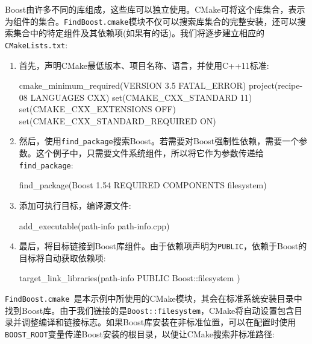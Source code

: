
Boost由许多不同的库组成，这些库可以独立使用。CMake可将这个库集合，表示为组件的集合。\texttt{FindBoost.cmake}模块不仅可以搜索库集合的完整安装，还可以搜索集合中的特定组件及其依赖项(如果有的话)。我们将逐步建立相应的\texttt{CMakeLists.txt}:

\begin{enumerate}
\item 首先，声明CMake最低版本、项目名称、语言，并使用C++11标准:

\begin{codebox}[cmake]
cmake_minimum_required(VERSION 3.5 FATAL_ERROR)
project(recipe-08 LANGUAGES CXX)
set(CMAKE_CXX_STANDARD 11)
set(CMAKE_CXX_EXTENSIONS OFF)
set(CMAKE_CXX_STANDARD_REQUIRED ON)
\end{codebox}

\item 然后，使用\texttt{find\_package}搜索Boost。若需要对Boost强制性依赖，需要一个参数。这个例子中，只需要文件系统组件，所以将它作为参数传递给\texttt{find\_package}:

\begin{codebox}[cmake]
find_package(Boost 1.54 REQUIRED COMPONENTS filesystem)
\end{codebox}

\item 添加可执行目标，编译源文件:

\begin{codebox}[cmake]
add_executable(path-info path-info.cpp)
\end{codebox}

\item 最后，将目标链接到Boost库组件。由于依赖项声明为\texttt{PUBLIC}，依赖于Boost的目标将自动获取依赖项:

\begin{codebox}[cmake]
target_link_libraries(path-info
  PUBLIC
    Boost::filesystem
    )
\end{codebox}

\end{enumerate}


\texttt{FindBoost.cmake }是本示例中所使用的CMake模块，其会在标准系统安装目录中找到Boost库。由于我们链接的是\texttt{Boost::filesystem}，CMake将自动设置包含目录并调整编译和链接标志。如果Boost库安装在非标准位置，可以在配置时使用\texttt{BOOST\_ROOT}变量传递Boost安装的根目录，以便让CMake搜索非标准路径:


